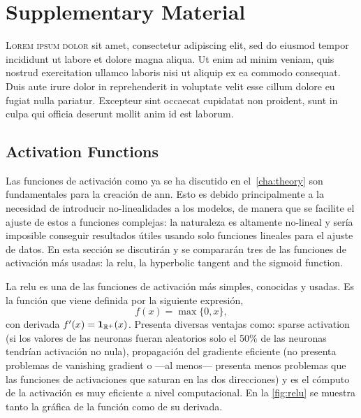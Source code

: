 

\chapter{Supplementary Material}\label{cha:extra}



\lettrine{L}{orem ipsum dolor} sit amet, consectetur adipiscing elit, sed do
eiusmod tempor incididunt ut labore et dolore magna aliqua. Ut enim ad minim
veniam, quis nostrud exercitation ullamco laboris nisi ut aliquip ex ea commodo
consequat. Duis aute irure dolor in reprehenderit in voluptate velit esse
cillum dolore eu fugiat nulla pariatur. Excepteur sint occaecat cupidatat non
proident, sunt in culpa qui officia deserunt mollit anim id est laborum.



\section{Activation Functions}%
\label{sec:activation}

Las funciones de activación como ya se ha discutido en el\ \vref{cha:theory}
son fundamentales para la creación de \gls{ann}. Esto es debido principalmente
a la necesidad de introducir no-linealidades a los modelos, de manera que se
facilite el ajuste de estos a funciones complejas: la naturaleza es altamente
no-lineal y sería imposible conseguir resultados útiles usando solo funciones
lineales para el ajuste de datos. En esta sección se discutirán y se compararán
tres de las funciones de activación más usadas: la \gls{relu}, la hyperbolic
tangent and the sigmoid function.

La \gls{relu} es una de las funciones de activación más simples, conocidas y
usadas. Es la función que viene definida por la siguiente expresión,
\begin{equation}
  f(x) = \max\{0, x\},
\end{equation}
con derivada \(f^\prime(x) = \mathbf{1}_{\mathbb{R}^+}(x)\). Presenta diversas ventajas
como: sparse activation (si los valores de las neuronas fueran aleatorios solo
el 50\% de las neuronas tendrían activación no nula), propagación del gradiente
eficiente (no presenta problemas de vanishing gradient o ---al menos---
presenta menos problemas que las funciones de activaciones que saturan en las
dos direcciones) y es el cómputo de la activación es muy eficiente a nivel
computacional. En la \vref{fig:relu} se muestra tanto la gráfica de la función
como de su derivada.

